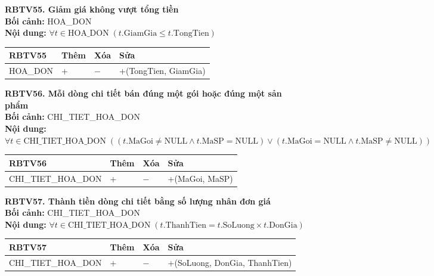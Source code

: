 \documentclass[11pt, a4paper]{article}
\begin{document}
\vspace{0.8em}
\textbf{RBTV55. Giảm giá không vượt tổng tiền} \\
\textbf{Bối cảnh:} HOA\_DON \\
\textbf{Nội dung:} $\forall t \in \text{HOA\_DON} \; (t.\text{GiamGia} \le t.\text{TongTien})$

\vspace{0.3em}
\begin{small}
\begin{tabularx}{\textwidth}{| C{4.2cm} | C{2cm} | C{2cm} | Y |}
\hline
\textbf{RBTV55} & \textbf{Thêm} & \textbf{Xóa} & \textbf{Sửa} \\
\hline
HOA\_DON & + & $-$ & +(TongTien, GiamGia) \\
\hline
\end{tabularx}
\end{small}

\vspace{0.8em}
\textbf{RBTV56. Mỗi dòng chi tiết bán đúng một gói hoặc đúng một sản phẩm} \\
\textbf{Bối cảnh:} CHI\_TIET\_HOA\_DON \\
\textbf{Nội dung:} $\forall t \in \text{CHI\_TIET\_HOA\_DON} \; ((t.\text{MaGoi} \neq \text{NULL} \land t.\text{MaSP} = \text{NULL}) \lor (t.\text{MaGoi} = \text{NULL} \land t.\text{MaSP} \neq \text{NULL}))$

\vspace{0.3em}
\begin{small}
\begin{tabularx}{\textwidth}{| C{4.2cm} | C{2cm} | C{2cm} | Y |}
\hline
\textbf{RBTV56} & \textbf{Thêm} & \textbf{Xóa} & \textbf{Sửa} \\
\hline
CHI\_TIET\_HOA\_DON & + & $-$ & +(MaGoi, MaSP) \\
\hline
\end{tabularx}
\end{small}

\vspace{0.8em}
\textbf{RBTV57. Thành tiền dòng chi tiết bằng số lượng nhân đơn giá} \\
\textbf{Bối cảnh:} CHI\_TIET\_HOA\_DON \\
\textbf{Nội dung:} $\forall t \in \text{CHI\_TIET\_HOA\_DON} \; (t.\text{ThanhTien} = t.\text{SoLuong} \times t.\text{DonGia})$

\vspace{0.3em}
\begin{small}
\begin{tabularx}{\textwidth}{| C{4.2cm} | C{2cm} | C{2cm} | Y |}
\hline
\textbf{RBTV57} & \textbf{Thêm} & \textbf{Xóa} & \textbf{Sửa} \\
\hline
CHI\_TIET\_HOA\_DON & + & $-$ & +(SoLuong, DonGia, ThanhTien) \\
\hline
\end{tabularx}
\end{small}
\end{document}
